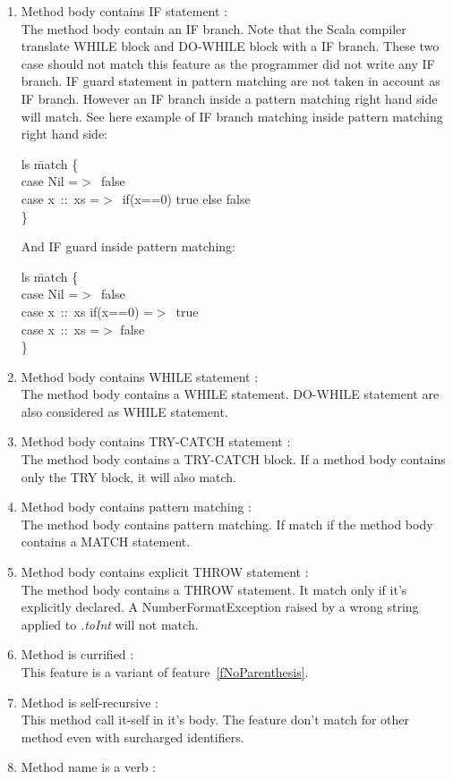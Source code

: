 \documentclass[12pt]{article}
\newcommand{\code}[1]{{\fontfamily{phv}\selectfont \small{\begin{tabbing} #1 \end{tabbing}}}}
\begin{document}
\begin{enumerate}
\item Method body contains IF statement :\\
	The method body contain an IF branch. Note that the Scala compiler translate WHILE block and DO-WHILE block with a IF branch. These two case should not match this feature as the programmer did not write any IF branch. IF guard statement in pattern matching are not taken in account as IF branch. However an IF branch inside a pattern matching right hand side will match. See here example of IF branch matching inside pattern matching right hand side:
\code{
ls \=match \{\\
\>case Nil =$>$\ false\\
\>case x\ ::\ xs =$>$\ if(x==0) true else false\\
\}
}
And IF guard inside pattern matching:
\code{
ls \=match \{\\
\>case Nil =$>$\ false\\
\>case x\ ::\ xs if(x==0) =$>$\ true\\
\>case x\ ::\ xs =$>$ false\\
\}
}
\item Method body contains WHILE statement :\\
	The method body contains a WHILE statement. DO-WHILE statement are also considered as WHILE statement.
\item Method body contains TRY-CATCH statement :\\
	The method body contains a TRY-CATCH block. If a method body contains only the TRY block, it will also match.
\item Method body contains pattern matching : \\
	The method body contains pattern matching. If match if the method body contains a MATCH statement.
\item Method body contains explicit THROW statement :\\
	The method body contains a THROW statement. It match only if it's explicitly declared. A NumberFormatException raised by a wrong string applied to \textit{.toInt} will not match.
\item Method is currified : \\
	This feature is a variant of feature~\ref{fNoParenthesis}.
\item Method is self-recursive : \\
	This method call it-self in it's body. The feature don't match for other method even with surcharged identifiers.
\item Method name is a verb : \label{fVerb}\\

\end{enumerate}
\end{document}

